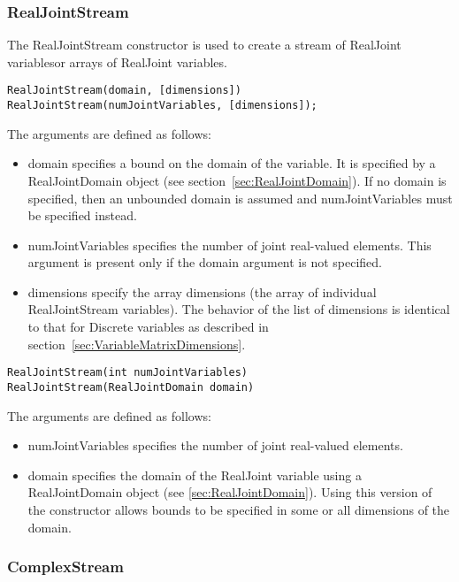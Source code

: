 \subsubsection{RealJointStream}


The RealJointStream constructor is used to create a stream of RealJoint variables\ifmatlab or arrays of RealJoint variables\fi.

\ifmatlab
\begin{lstlisting}
RealJointStream(domain, [dimensions])
RealJointStream(numJointVariables, [dimensions]);
\end{lstlisting}

The arguments are defined as follows:

\begin{itemize}
\item domain specifies a bound on the domain of the variable.  It is specified by a RealJointDomain object (see section~\ref{sec:RealJointDomain}).  If no domain is specified, then an unbounded domain is assumed and numJointVariables must be specified instead.
\item numJointVariables specifies the number of joint real-valued elements. This argument is present only if the domain argument is not specified.
\item dimensions specify the array dimensions (the array of individual RealJointStream variables).  The behavior of the list of dimensions is identical to that for Discrete variables as described in section~\ref{sec:VariableMatrixDimensions}.
\end{itemize}
\fi

\ifjava
\begin{lstlisting}
RealJointStream(int numJointVariables)
RealJointStream(RealJointDomain domain)
\end{lstlisting}

The arguments are defined as follows:

\begin{itemize}
\item numJointVariables specifies the number of joint real-valued elements.
\item domain specifies the domain of the RealJoint variable using a RealJointDomain object (see \ref{sec:RealJointDomain}).  Using this version of the constructor allows bounds to be specified in some or all dimensions of the domain.
\end{itemize}
\fi


\subsubsection{ComplexStream}

